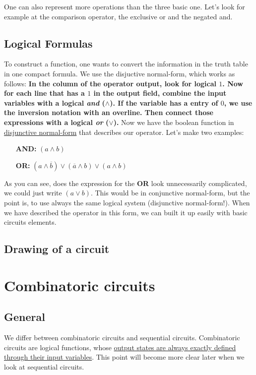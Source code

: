 \documentclass[10pt,a4paper]{article}
\begin{document}
One can also represent more operations than the three basic one. Let's look for example at the comparison operator, the exclusive or and the negated and. 


\subsection{Logical Formulas}
To construct a function, one wants to convert the information in the truth table in one compact formula. We use the disjuctive normal-form, which works as follows: 
\newline \textbf{In the column of the operator output, look for logical $1$. Now for each line that has a $1$ in the output field, combine the input variables with a logical \textit{and} ($\land$). If the variable has a entry of $0$, we use the inversion notation with an overline. Then connect those expressions with a logical \textit{or} ($\lor$).} 
\newline Now we have the boolean function in \underline{disjunctive normal-form} that describes our operator. Let's make two examples: \newline
\begin{enumerate}
 \item [\textbf{AND:}]$(a\land b)$
 \item [\textbf{OR:}]$(a\land \overline{b})\lor(\overline{a}\land b)\lor(a\land b)$
\end{enumerate}

As you can see, does the expression for the \textbf{OR} look unnecessarily complicated, we could just write $(a\lor b)$. This would be in conjunctive normal-form, but the point is, to use always the same logical system (disjunctive normal-form!). When we have described the operator in this form, we can built it up easily with basic circuits elements.  

\subsection{Drawing of a circuit}


\section{Combinatoric circuits}
\subsection{General}
We differ between combinatoric circuits and sequential circuits. Combinatoric circuits are logical functions, whose \underline{output states are always exactly defined through their input variables}. This point will become more clear later when we look at sequential circuits. 
\end{document}
